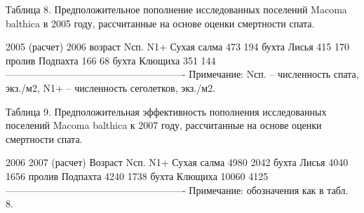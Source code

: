 Таблица 8. Предположительное пополнение исследованных поселений Macoma balthica в 2005 году, рассчитанные на основе оценки смертности спата.

2005 (расчет)
2006
возраст
Nсп.
N1+
Сухая салма
473
194
бухта Лисья
415
170
пролив Подпахта
166
68
бухта Клющиха
351
144
-------------------------------------------------------
Примечание: Nсп. – численность спата, экз./м2, N1+ – численность сеголетков, экз./м2.

Таблица 9. Предположительная эффективность пополнения исследованных поселений Macoma balthica к 2007 году, рассчитанные на основе оценки смертности спата.

2006
2007 (расчет)
Возраст
Nсп.
N1+
Сухая салма
4980
2042
бухта Лисья
4040
1656
пролив Подпахта
4240
1738
бухта Клющиха
10060
4125
-------------------------------------------------------
Примечание: обозначения как в табл. 8.

